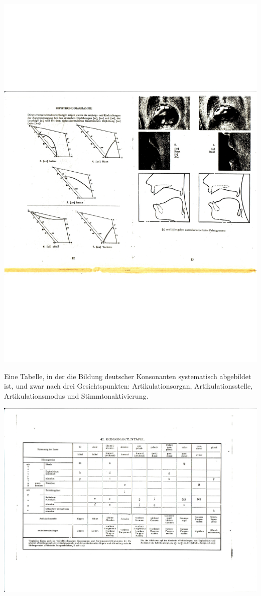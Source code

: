 \documentclass[
  letterpaper,
]{scrbook}
\begin{document}
\includegraphics[width=1\textwidth,height=\textheight]{./pictures/02f_Phon-Atlas-Seiten1-2_Diphthonge_page-0002.jpg}

Eine Tabelle, in der die Bildung deutscher Konsonanten systematisch
abgebildet ist, und zwar nach drei Gesichtspunkten: Artikulationsorgan,
Artikulationsstelle, Artikulationsmodus und Stimmtonaktivierung.

\includegraphics[width=1\textwidth,height=\textheight]{./pictures/02g_Konsonantentafel_page-0001.jpg}
\end{document}
